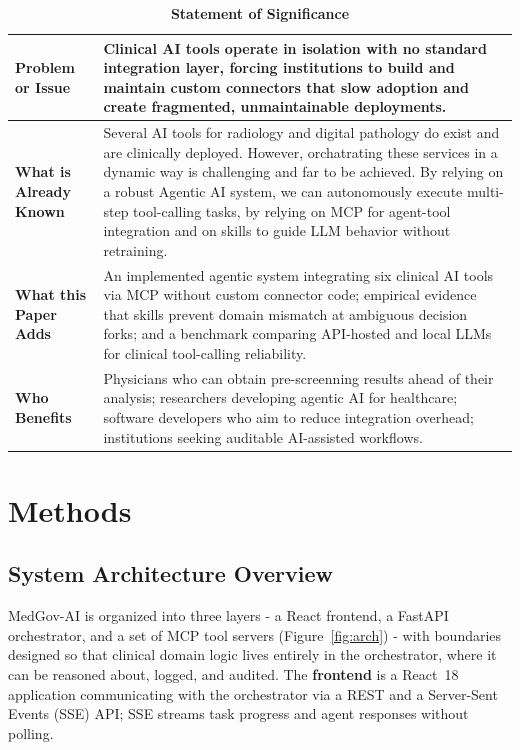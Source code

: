 \documentclass[1p,12pt]{elsarticle}
\begin{document}
\begin{table}[H]
  \caption*{\textbf{Statement of Significance}}
  \label{tab:significance}
  \centering
  \begin{tabular}{p{3.5cm}p{9cm}}
    \toprule
    \textbf{Problem or Issue} & Clinical AI tools operate in isolation with no standard integration layer, forcing institutions to build and maintain custom connectors that slow adoption and create fragmented, unmaintainable deployments. \\
    \midrule
    \textbf{What is Already Known} & Several AI tools for radiology and digital pathology do exist and are clinically deployed. However, orchatrating these services in a dynamic way is challenging and far to be achieved. By relying on a robust Agentic AI system, we can autonomously execute multi-step tool-calling tasks, by relying on MCP for agent-tool integration and on skills to guide LLM behavior without retraining. \\
    \midrule
    \textbf{What this Paper Adds} & An implemented agentic system integrating six clinical AI tools via MCP without custom connector code; empirical evidence that skills prevent domain mismatch at ambiguous decision forks; and a benchmark comparing API-hosted and local LLMs for clinical tool-calling reliability. \\
    \midrule
    \textbf{Who Benefits} & Physicians who can obtain pre-screenning results ahead of their analysis; researchers developing agentic AI for healthcare; software developers who aim to reduce integration overhead; institutions seeking auditable AI-assisted workflows.  \\
    \bottomrule
  \end{tabular}
\end{table}

\section{Methods}

\subsection{System Architecture Overview}

MedGov-AI is organized into three layers - a React frontend, a FastAPI orchestrator, and a set of MCP tool servers (Figure~\ref{fig:arch}) - with boundaries designed so that clinical domain logic lives entirely in the orchestrator, where it can be reasoned about, logged, and audited. The \textbf{frontend} is a React~18 application communicating with the orchestrator via a REST and a Server-Sent Events (SSE) API; SSE streams task progress and agent responses without polling.
\end{document}
